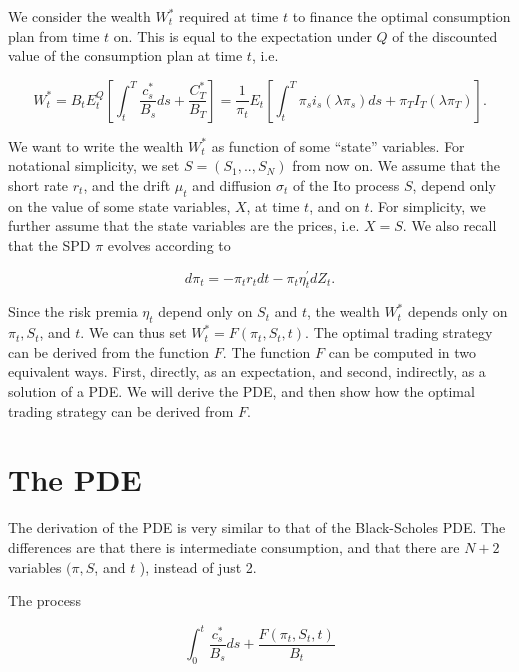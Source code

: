 \documentclass[\topdir/lecture\_notes.tex]{subfiles}
\begin{document}
We consider the wealth $W_{t}^{*}$ required at time $t$ to finance the optimal consumption plan from time $t$ on. This is equal to the expectation under $Q$ of the discounted value of the consumption plan at time $t$, i.e.

\begin{equation}
W_{t}^{*}=B_{t} E_{t}^{Q}\left[\int_{t}^{T} \frac{c_{s}^{*}}{B_{s}} d s+\frac{C_{T}^{*}}{B_{T}}\right]=\frac{1}{\pi_{t}} E_{t}\left[\int_{t}^{T} \pi_{s} i_{s}\left(\lambda \pi_{s}\right) d s+\pi_{T} I_{T}\left(\lambda \pi_{T}\right)\right] . \label{eq:6.5.30}
\end{equation}

We want to write the wealth $W_{t}^{*}$ as function of some ``state'' variables. For notational simplicity, we set $S=\left(S_{1}, . ., S_{N}\right)$ from now on. We assume that the short rate $r_{t}$, and the drift $\mu_{t}$ and diffusion $\sigma_{t}$ of the Ito process $S$, depend only on the value of some state variables, $X$, at time $t$, and on $t$. For simplicity, we further assume that the state variables are the prices, i.e. $X=S$. We also recall that the SPD $\pi$ evolves according to

\begin{equation}
d \pi_{t}=-\pi_{t} r_{t} d t-\pi_{t} \eta_{t}^{\prime} d Z_{t} . \label{eq:6.5.31}
\end{equation}

Since the risk premia $\eta_{t}$ depend only on $S_{t}$ and $t$, the wealth $W_{t}^{*}$ depends only on $\pi_{t}, S_{t}$, and $t$. We can thus set $W_{t}^{*}=F\left(\pi_{t}, S_{t}, t\right)$. The optimal trading strategy can be derived from the function $F$. The function $F$ can be computed in two equivalent ways. First, directly, as an expectation, and second, indirectly, as a solution of a PDE. We will derive the PDE, and then show how the optimal trading strategy can be derived from $F$.

\section{The PDE}
The derivation of the PDE is very similar to that of the Black-Scholes PDE. The differences are that there is intermediate consumption, and that there are $N+2$ variables $(\pi, S$, and $t$ ), instead of just 2.

The process

\begin{equation}
\int_{0}^{t} \frac{c_{s}^{*}}{B_{s}} d s+\frac{F\left(\pi_{t}, S_{t}, t\right)}{B_{t}}
\end{equation}
\end{document}

